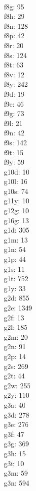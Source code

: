 \begin{multicols}{8}
  \\f8g: 95
  \\f8h: 29
  \\f8n: 128
  \\f8p: 42
  \\f8r: 20
  \\f8s: 124
  \\f8t: 63
  \\f8v: 12
  \\f8y: 242
  \\f9d: 19
  \\f9e: 46
  \\f9g: 73
  \\f9l: 21
  \\f9n: 42
  \\f9s: 142
  \\f9t: 15
  \\f9y: 59
  \\g10d: 10
  \\g10l: 16
  \\g10s: 74
  \\g11y: 10
  \\g12g: 10
  \\g16g: 13
  \\g1d: 305
  \\g1m: 13
  \\g1n: 54
  \\g1p: 44
  \\g1s: 11
  \\g1t: 752
  \\g1y: 33
  \\g2d: 855
  \\g2e: 1349
  \\g2f: 13
  \\g2l: 185
  \\g2m: 20
  \\g2n: 91
  \\g2p: 14
  \\g2s: 269
  \\g2t: 44
  \\g2w: 255
  \\g2y: 110
  \\g3a: 40
  \\g3d: 278
  \\g3e: 276
  \\g3f: 47
  \\g3g: 369
  \\g3h: 15
  \\g3i: 10
  \\g3m: 59
  \\g3n: 594

\end{multicols}
